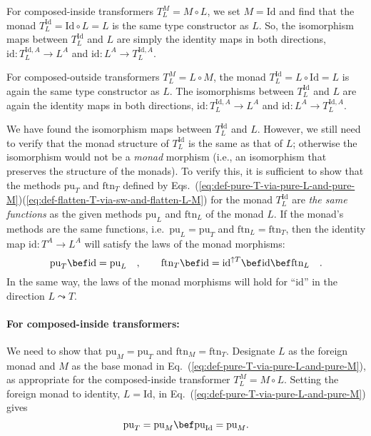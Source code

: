 For composed-inside transformers $T_{L}^{M}=M\circ L$, we set $M=\text{Id}$
and find that the monad $T_{L}^{\text{Id}}=\text{Id}\circ L=L$ is
the same type constructor as $L$. So, the isomorphism maps between
$T_{L}^{\text{Id}}$ and $L$ are simply the identity maps in both
directions, $\text{id}:T_{L}^{\text{Id},A}\rightarrow L^{A}$ and
$\text{id}:L^{A}\rightarrow T_{L}^{\text{Id},A}$. 

For composed-outside transformers $T_{L}^{M}=L\circ M$, the monad
$T_{L}^{\text{Id}}=L\circ\text{Id}=L$ is again the same type constructor
as $L$. The isomorphisms between $T_{L}^{\text{Id}}$ and $L$ are
again the identity maps in both directions, $\text{id}:T_{L}^{\text{Id},A}\rightarrow L^{A}$
and $\text{id}:L^{A}\rightarrow T_{L}^{\text{Id},A}$. 

We have found the isomorphism maps between $T_{L}^{\text{Id}}$ and
$L$. However, we still need to verify that the monad structure of
$T_{L}^{\text{Id}}$ is the same as that of $L$; otherwise the isomorphism
would not be a \emph{monad} morphism (i.e., an isomorphism that preserves
the structure of the monads). To verify this, it is sufficient to
show that the methods $\text{pu}_{T}$ and $\text{ftn}_{T}$ defined
by Eqs.~(\ref{eq:def-pure-T-via-pure-L-and-pure-M})\textendash (\ref{eq:def-flatten-T-via-sw-and-flatten-L-M})
for the monad $T_{L}^{\text{Id}}$ are \emph{the same functions} as
the given methods $\text{pu}_{L}$ and $\text{ftn}_{L}$ of the monad
$L$. If the monad\textsf{'}s methods are the same functions, i.e.~$\text{pu}_{L}=\text{pu}_{T}$
and $\text{ftn}_{L}=\text{ftn}_{T}$, then the identity map $\text{id}:T^{A}\rightarrow L^{A}$
will satisfy the laws of the monad morphisms:
\[
\text{pu}_{T}\bef\text{id}=\text{pu}_{L}\quad,\quad\quad\text{ftn}_{T}\bef\text{id}=\text{id}^{\uparrow T}\bef\text{id}\bef\text{ftn}_{L}\quad.
\]
In the same way, the laws of the monad morphisms will hold for \textsf{``}$\text{id}$\textsf{''}
in the direction $L\leadsto T$. 

\paragraph{For composed-inside transformers:}

We need to show that $\text{pu}_{M}=\text{pu}_{T}$ and $\text{ftn}_{M}=\text{ftn}_{T}$.
Designate $L$ as the foreign monad and $M$ as the base monad in
Eq.~(\ref{eq:def-pure-T-via-pure-L-and-pure-M}), as appropriate
for the composed-inside transformer $T_{L}^{M}=M\circ L$. Setting
the foreign monad to identity, $L=\text{Id}$, in Eq.~(\ref{eq:def-pure-T-via-pure-L-and-pure-M})
gives
\[
\text{pu}_{T}=\text{pu}_{M}\bef\text{pu}_{\text{Id}}=\text{pu}_{M}.
\]


